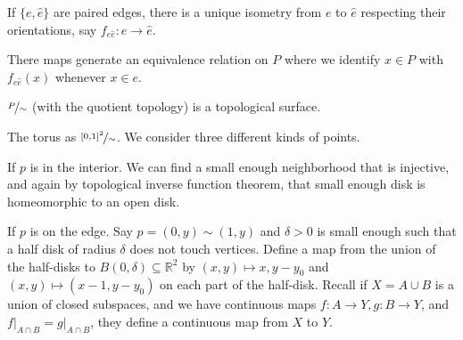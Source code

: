 \begin{enumerate}
    If \(\{e, \hat{e}\}\) are paired edges, there is a unique isometry from \(e\) to \(\hat{e} \) respecting their orientations, say \(f_{e\hat{e}}: e \to \hat{e} \).

    There maps generate an equivalence relation on \(P\) where we identify \(x \in P\) with \(f_{e \hat{e} }(x)\) whenever \(x \in e\).
    \begin{lemma}
        \(\nicefrac{P}{\sim}\) (with the quotient topology) is a topological surface.
    \end{lemma}
    \begin{example}
        The torus as \(\nicefrac{[0,1]^2}{\sim}\). We consider three different kinds of points.

        If \(p\) is in the interior. We can find a small enough neighborhood that is injective, and again by topological inverse function theorem, that small enough disk is homeomorphic to an open disk.

        If \(p\) is on the edge. Say \(p = (0,y) \sim (1,y)\) and \(\delta >0\) is small enough such that a half disk of radius \(\delta\) does not touch vertices. Define a map from the union of the half-disks to \(B(0,\delta) \subseteq \mathbb{R}^2\) by \((x,y) \mapsto x, y - y_0\) and \((x,y)\mapsto (x-1,y-y_0)\) on each part of the half-disk. Recall if \(X = A \cup B\) is a union of closed subspaces, and we have continuous maps \(f: A\to Y, g: B\to Y\), and \(\left.f\right|_{A\cap B} = \left.g\right|_{A\cap B}\), they define a continuous map from \(X\) to \(Y\).
    \end{example}
\end{enumerate}